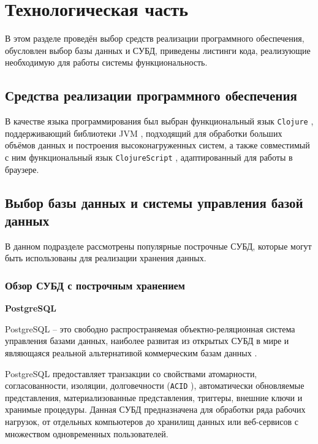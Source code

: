 \section{Технологическая часть}

В этом разделе проведён выбор средств реализации программного обеспечения, обусловлен выбор базы данных и СУБД, приведены листинги кода, реализующие необходимую для работы системы функциональность.

\subsection{Средства реализации программного обеспечения}

В качестве языка программирования был выбран функциональный язык \texttt{Clojure} \cite{clojure}, поддерживающий библиотеки JVM \cite{jvm}, подходящий для обработки больших объёмов данных и построения высоконагруженных систем, а также совместимый с ним функциональный язык \texttt{ClojureScript} \cite{cljs}, адаптированный для работы в браузере.

\subsection{Выбор базы данных и системы управления базой данных}

В данном подразделе рассмотрены популярные построчные СУБД, которые могут быть использованы для реализации хранения данных.

\subsubsection{Обзор СУБД с построчным хранением}

\noindent\textbf{PostgreSQL}

PostgreSQL \cite{postgresql} -- это свободно распространяемая объектно-реляционная система управления базами данных, наиболее развитая из открытых СУБД в мире и являющаяся реальной альтернативой коммерческим базам данных \cite{postgresql-fact}.

PostgreSQL предоставляет транзакции со свойствами атомарности, согласованности, изоляции, долговечности (\texttt{ACID} \cite{acid}), автоматически обновляемые представления, материализованные представления, триггеры, внешние ключи и хранимые процедуры. Данная СУБД предназначена для обработки ряда рабочих нагрузок, от отдельных компьютеров до хранилищ данных или веб-сервисов с множеством одновременных пользователей. 

